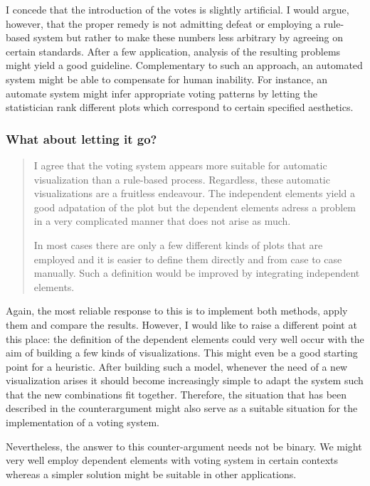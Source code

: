 \documentclass[]{report}
\theoremstyle{definition}
\theoremstyle{definition}
\theoremstyle{definition}
\theoremstyle{remark}
\begin{document}
I concede that the introduction of the votes is slightly artificial. I
would argue, however, that the proper remedy is not admitting defeat or
employing a rule-based system but rather to make these numbers less
arbitrary by agreeing on certain standards. After a few application,
analysis of the resulting problems might yield a good guideline.
Complementary to such an approach, an automated system might be able to
compensate for human inability. For instance, an automate system might
infer appropriate voting patterns by letting the statistician rank
different plots which correspond to certain specified aesthetics.

\subsubsection{What about letting it
go?}\label{what-about-letting-it-go}

\begin{quote}
I agree that the voting system appears more suitable for automatic
visualization than a rule-based process. Regardless, these automatic
visualizations are a fruitless endeavour. The independent elements yield
a good adpatation of the plot but the dependent elements adress a
problem in a very complicated manner that does not arise as much.

In most cases there are only a few different kinds of plots that are
employed and it is easier to define them directly and from case to case
manually. Such a definition would be improved by integrating independent
elements.
\end{quote}

Again, the most reliable response to this is to implement both methods,
apply them and compare the results. However, I would like to raise a
different point at this place: the definition of the dependent elements
could very well occur with the aim of building a few kinds of
visualizations. This might even be a good starting point for a
heuristic. After building such a model, whenever the need of a new
visualization arises it should become increasingly simple to adapt the
system such that the new combinations fit together. Therefore, the
situation that has been described in the counterargument might also
serve as a suitable situation for the implementation of a voting system.

Nevertheless, the answer to this counter-argument needs not be binary.
We might very well employ dependent elements with voting system in
certain contexts whereas a simpler solution might be suitable in other
applications.
\end{document}
